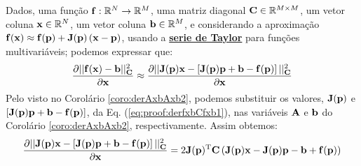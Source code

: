\begin{myproofT}\label{proof:theo:derfxbCfxb}
Dados,
uma função $\VECTOR{f}:\mathbb{R}^{N} \rightarrow \mathbb{R}^{M}$, 
uma matriz diagonal $\MATRIX{C}\in \mathbb{R}^{M\times M}$, 
um vetor coluna $\VECTOR{x}\in \mathbb{R}^{N}$, 
um vetor coluna $\VECTOR{b}\in \mathbb{R}^{M}$, 
e considerando a aproximação
$\VECTOR{f}(\VECTOR{x})\approx \VECTOR{f}(\VECTOR{p})+\MATRIX{J}(\VECTOR{p})\left(\VECTOR{x}-\VECTOR{p}\right)$,
usando a \hyperref[def:taylor]{\textbf{serie de Taylor}} para funções multivariáveis;
podemos expressar que:
\begin{equation}\label{eq:proof:derfxbCfxb1}
\frac{\partial ||\VECTOR{f}(\VECTOR{x})-\VECTOR{b}||_{\MATRIX{C}}^2}{\partial \VECTOR{x}} \approx
\frac{\partial ||\MATRIX{J}(\VECTOR{p})\VECTOR{x}-\left[\MATRIX{J}(\VECTOR{p})\VECTOR{p}+\VECTOR{b}-\VECTOR{f}(\VECTOR{p})\right]||_{\MATRIX{C}}^2}{\partial \VECTOR{x}}
\end{equation}
Pelo visto no Corolário \ref{coro:derAxbAxb2}, podemos substituir os valores,
$\MATRIX{J}(\VECTOR{p})$ e 
$\left[\MATRIX{J}(\VECTOR{p})\VECTOR{p}+\VECTOR{b}-\VECTOR{f}(\VECTOR{p})\right]$,
da Eq. (\ref{eq:proof:derfxbCfxb1}), nas variáveis $\MATRIX{A}$ e $\VECTOR{b}$ 
do Corolário \ref{coro:derAxbAxb2}, respectivamente. Assim obtemos:
\begin{equation}\label{eq:proof:derfxbCfxb2}
\frac{\partial ||\MATRIX{J}(\VECTOR{p})\VECTOR{x}-\left[\MATRIX{J}(\VECTOR{p})\VECTOR{p}+\VECTOR{b}-\VECTOR{f}(\VECTOR{p})\right]||_{\MATRIX{C}}^2}{\partial \VECTOR{x}}  = 
2 \MATRIX{J}(\VECTOR{p})^{\transpose}\MATRIX{C}\left( \MATRIX{J}(\VECTOR{p})\VECTOR{x}-\MATRIX{J}(\VECTOR{p})\VECTOR{p}-\VECTOR{b}+\VECTOR{f}(\VECTOR{p})\right) 
\end{equation}
\end{myproofT}


